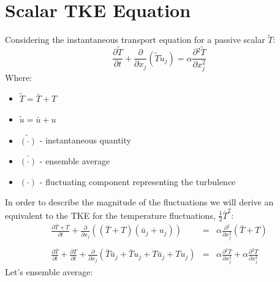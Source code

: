 \documentclass[11pt, a4paper]{article}
\newcommand{\parder}[2]{\frac{\partial {#1}}{\partial {#2}}}
\begin{document}
\newpage
\section{Scalar TKE Equation}
Considering the instantaneous transport equation for a passive scalar $\tilde{T}$:
\begin{equation}
    \parder{\tilde{T}}{t}+\parder{}{x_j}\left(\tilde{T}\tilde{u}_j\right)=\alpha\parder{^2\tilde{T}}{x^2_j}
\end{equation}
Where:
\begin{itemize}
    \item $\tilde{T}=\bar{T}+T$
    \item $\tilde{u}=\bar{u}+u$
    \item $\tilde{\left(\cdot\right)}$ - instantaneous
quantity
    \item $\bar{\left(\cdot\right)}$ - ensemble average
    \item $\left(\cdot\right)$ - fluctuating component representing the
turbulence
\end{itemize}
In order to describe the magnitude of the fluctuations we will derive an equivalent to the TKE for the temperature fluctuations, $\frac{1}{2}\bar{T}^2$:
\begin{equation}
    \begin{array}{rcl}
        \displaystyle \parder{\bar{T}+T}{t}+\parder{}{x_j}\left(\left(\bar{T}+T\right)\left(\bar{u}_j+u_j\right)\right) & = & \displaystyle \alpha\parder{^2}{x^2_j}\left(\bar{T}+T\right) \\\\
        \displaystyle \parder{\bar{T}}{t}+\parder{T}{t}+\parder{}{x_j}\left(\bar{T}\bar{u}_j+\bar{T}u_j+T\bar{u}_j+Tu_j\right) & = & \displaystyle \alpha\parder{^2\bar{T}}{x^2_j}+\alpha\parder{^2T}{x^2_j}
        \label{eq: given equation}
    \end{array}
\end{equation}
Let's ensemble average: %
\end{document}
